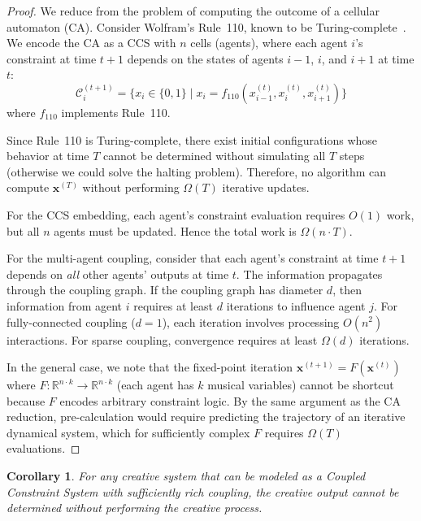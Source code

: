 \documentclass[11pt,a4paper]{article}
\newtheorem{corollary}[theorem]{Corollary}
\newcommand{\R}{\mathbb{R}}
\newcommand{\calC}{\mathcal{C}}
\begin{document}
\begin{proof}
We reduce from the problem of computing the outcome of a cellular automaton (CA). Consider Wolfram's Rule~110, known to be Turing-complete~\citep{wolfram2002}. We encode the CA as a CCS with $n$ cells (agents), where each agent $i$'s constraint at time $t+1$ depends on the states of agents $i-1$, $i$, and $i+1$ at time $t$:
\begin{equation}
  \calC_i^{(t+1)} = \{x_i \in \{0,1\} \mid x_i = f_{110}(x_{i-1}^{(t)}, x_i^{(t)}, x_{i+1}^{(t)})\}
\end{equation}
where $f_{110}$ implements Rule~110.

Since Rule~110 is Turing-complete, there exist initial configurations whose behavior at time $T$ cannot be determined without simulating all $T$ steps (otherwise we could solve the halting problem). Therefore, no algorithm can compute $\mathbf{x}^{(T)}$ without performing $\Omega(T)$ iterative updates.

For the CCS embedding, each agent's constraint evaluation requires $O(1)$ work, but all $n$ agents must be updated. Hence the total work is $\Omega(n \cdot T)$.

For the multi-agent coupling, consider that each agent's constraint at time $t+1$ depends on \emph{all} other agents' outputs at time $t$. The information propagates through the coupling graph. If the coupling graph has diameter $d$, then information from agent $i$ requires at least $d$ iterations to influence agent $j$. For fully-connected coupling ($d=1$), each iteration involves processing $O(n^2)$ interactions. For sparse coupling, convergence requires at least $\Omega(d)$ iterations.

In the general case, we note that the fixed-point iteration $\mathbf{x}^{(t+1)} = F(\mathbf{x}^{(t)})$ where $F: \R^{n \cdot k} \to \R^{n \cdot k}$ (each agent has $k$ musical variables) cannot be shortcut because $F$ encodes arbitrary constraint logic. By the same argument as the CA reduction, pre-calculation would require predicting the trajectory of an iterative dynamical system, which for sufficiently complex $F$ requires $\Omega(T)$ evaluations.
\end{proof}

\begin{corollary}\label{cor:creative}
For any creative system that can be modeled as a Coupled Constraint System with sufficiently rich coupling, the creative output cannot be determined without performing the creative process.
\end{corollary}
\end{document}
